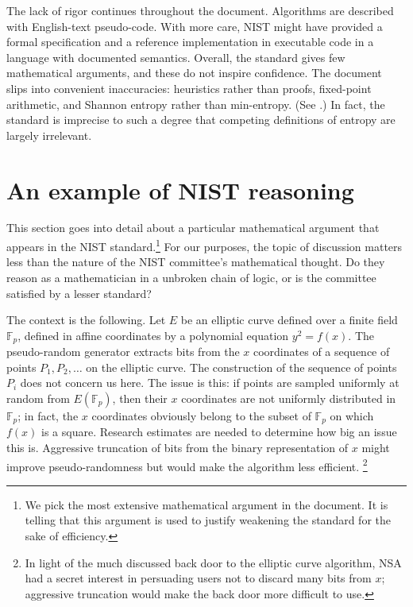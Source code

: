 \documentclass[11pt]{amsart} %
\newcommand{\ring}[1]{\mathbb{#1}}
\begin{document}
The lack of rigor continues throughout the document.  Algorithms are described with English-text
pseudo-code.  With more care,  NIST might
have provided a formal specification and a reference implementation in executable code in a language
with documented semantics.
Overall, the standard gives few mathematical arguments,
and these do not inspire confidence.   The document 
slips into convenient inaccuracies:  
heuristics rather than proofs,  fixed-point arithmetic, 
and Shannon entropy rather than min-entropy.  (See \cite[Appendix C.2]{NIST}.)
In fact, the standard is imprecise to such a degree that competing definitions of entropy are largely irrelevant.

\section{An example of NIST reasoning}

This section goes into detail about a particular mathematical argument that appears in the
NIST standard.\footnote{We pick the most extensive mathematical argument in the document.  It is telling
that this argument is used to justify weakening the standard for the sake of efficiency.} 
For our purposes, the topic of discussion matters less than the nature of the NIST committee's mathematical
thought.  Do they reason as a mathematician in a unbroken chain of logic, or is the committee
satisfied by a lesser standard? 


The context is the following.  Let $E$ be an elliptic curve defined over a finite field $\ring{F}_p$,
defined in affine coordinates by a polynomial equation
$y^2 = f(x)$.
The pseudo-random generator extracts bits from the
 $x$ coordinates of a sequence of points $P_1, P_2,\ldots $ 
on the elliptic curve.  The construction of the sequence of points $P_i$ does not concern us here.
The issue is this: if points are sampled uniformly at random from $E(\ring{F}_p)$, then their $x$ coordinates are 
not uniformly distributed in $\ring{F}_p$; in fact, the $x$ coordinates obviously belong to the subset of $\ring{F}_p$ on which $f(x)$ is a square.  
Research estimates are needed to
determine how big an issue this is.   Aggressive truncation of bits from the binary representation of $x$ might improve pseudo-randomness
but would make the algorithm less efficient.%
\footnote{In light of the much discussed back door to the elliptic curve algorithm, NSA had a secret interest
in persuading users not to discard many bits from  $x$; aggressive truncation would
make the back door more difficult to use.}
\end{document}
